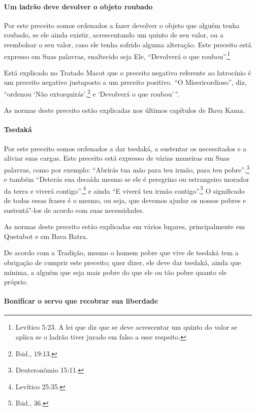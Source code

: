 \begin{multicols}{2}
\paragraph{Um ladrão deve devolver o objeto roubado}

Por este preceito somos ordenados a fazer devolver o objeto que alguém
tenha roubado, se ele ainda existir, acrescentando um quinto de seu
valor, ou a reembolsar o seu valor, caso ele tenha sofrido alguma
alteração. Este preceito está expresso em Suas palavras, enaltecido seja Ele,
``Devolverá o que roubou''.\footnote{Levítico 5:23. A lei que diz que se deve acrescentar um quinto do valor se aplica se
  o ladrão tiver jurado em falso a esse respeito.}

Está explicado no Tratado Macot\starr{} que o preceito negativo referente
ao latrocínio é um preceito negativo justaposto a um preceito positivo.
``O Misericordioso'', diz, ``ordenou `Não extorquirás',\footnote{Ibid., 19:13.} e
`Devolverá o que roubou'\,''.

As normas deste preceito estão explicadas nos últimos capítulos de Bava Kama\starr.

\paragraph{Tsedaká\starr}

Por este preceito somos ordenados a dar tsedaká, a sustentar
os necessitados e a aliviar suas cargas. Este preceito está expresso de
várias maneiras em Suas palavras, como por exemplo: ``Abrirás tua mão para teu
irmão, para teu pobre'',\footnote{Deuteronômio 15:11.} e também ``Deterás sua decaída
mesmo se ele é peregrino ou estrangeiro morador da terra e viverá
contigo'',\footnote{Levítico 25:35.} e ainda ``E viverá teu irmão contigo''.\footnote{Ibid., 36.} O significado de todas essas frases é o mesmo, ou seja, que
devemos ajudar os nossos pobres e sustentá"-los de acordo com suas
necessidades.

As normas deste preceito estão explicadas em vários lugares,
principalmente em Quetubot\starr{} e em Bava Batra\starr.

De acordo com a Tradição, mesmo o homem pobre que vive de tsedaká\starr{}
tem a obrigação de cumprir este preceito; quer dizer, ele deve dar
tsedaká\starr, ainda que mínima, a alguém que seja mais pobre do que ele
ou tão pobre quanto ele próprio.

\paragraph{Bonificar o servo que recobrar sua liberdade}


\end{multicols}
